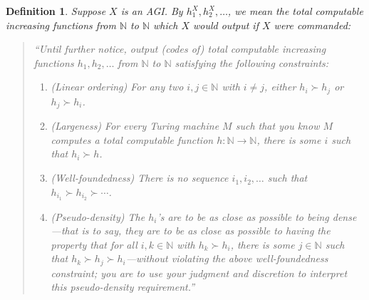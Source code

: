 \documentclass{article}
\newtheorem{definition}[theorem]{Definition}
\begin{document}
\begin{definition}
\label{fairsequencedefn}
    Suppose $X$ is an AGI. By $h^X_1,h^X_2,\ldots$, we mean the total computable
    increasing functions
    from $\mathbb N$ to $\mathbb N$ which $X$ would output if $X$ were commanded:
    \begin{quote}
        ``Until further notice, output (codes of) total computable increasing
        functions $h_1,h_2,\ldots$ from $\mathbb N$ to $\mathbb N$ satisfying the
        following constraints:
        \begin{enumerate}
            \item (Linear ordering) For any two $i,j\in\mathbb N$ with $i\neq j$, either
            $h_i\succ h_j$ or $h_j\succ h_i$.
            \item (Largeness) For every Turing machine $M$ such that you know
            $M$ computes a total computable function $h:\mathbb N\to\mathbb N$,
            there is some $i$ such that $h_i\succ h$.
            \item (Well-foundedness) There is no sequence $i_1,i_2,\ldots$ such that
            $h_{i_1}\succ h_{i_2}\succ\cdots$.
            \item (Pseudo-density)
            The $h_i$'s are to be as close as possible to being \emph{dense}---that is
            to say, they are to be as close as possible to having the property that
            for all $i,k\in\mathbb N$ with $h_k\succ h_i$, there is some $j\in\mathbb N$
            such that $h_k\succ h_j\succ h_i$---without violating the above
            well-foundedness constraint; you are to use your judgment and discretion
            to interpret this pseudo-density requirement.''
        \end{enumerate}
    \end{quote}
\end{definition}
\end{document}
